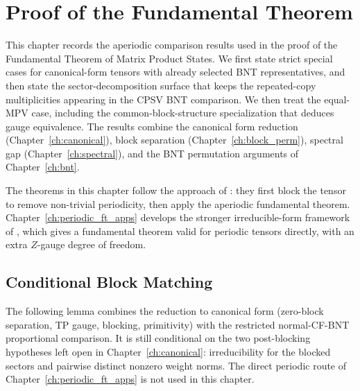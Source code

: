 \chapter{Proof of the Fundamental Theorem}\label{ch:assembly}

This chapter records the aperiodic comparison results used in the proof of the
Fundamental Theorem of Matrix Product States.  We first state strict special
cases for canonical-form tensors with already selected BNT
representatives, and then state the sector-decomposition surface that keeps the
repeated-copy multiplicities appearing in the CPSV BNT comparison.
We then treat the equal-MPV case, including the common-block-structure
specialization that deduces gauge equivalence.
The results combine the canonical form reduction
(Chapter~\ref{ch:canonical}),
block separation (Chapter~\ref{ch:block_perm}),
spectral gap (Chapter~\ref{ch:spectral}),
and the BNT permutation arguments of Chapter~\ref{ch:bnt}.

The theorems in this chapter follow the approach of
\cite{Cirac2017MPDO_AnnPhys}:
they first block the tensor to remove non-trivial periodicity, then
apply the aperiodic fundamental theorem.
Chapter~\ref{ch:periodic_ft_apps} develops the stronger
irreducible-form framework of \cite{DeLasCuevas2017Irreducible},
which gives a fundamental theorem valid for periodic tensors directly,
with an extra $Z$-gauge degree of freedom.

\section{Conditional Block Matching}%
\label{sec:assembly_weak}

The following lemma combines the reduction to canonical form
(zero-block separation, TP gauge, blocking, primitivity)
with the restricted normal-CF-BNT proportional comparison.
It is still conditional on the two post-blocking hypotheses left open in
Chapter~\ref{ch:canonical}: irreducibility for the blocked sectors and
pairwise distinct nonzero weight norms.
The direct periodic route of Chapter~\ref{ch:periodic_ft_apps} is not
used in this chapter.

